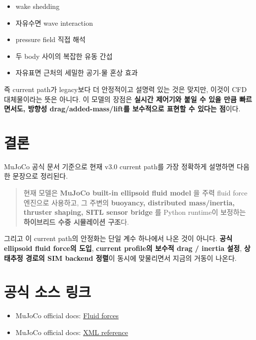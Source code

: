 \documentclass[11pt,a4paper]{article}
\begin{document}
\begin{itemize}[leftmargin=2em]
  \item wake shedding
  \item 자유수면 wave interaction
  \item pressure field 직접 해석
  \item 두 body 사이의 복잡한 유동 간섭
  \item 자유표면 근처의 세밀한 공기-물 혼상 효과
\end{itemize}

즉 current path가 legacy보다 더 안정적이고 설명력 있는 것은 맞지만, 이것이 CFD 대체물이라는 뜻은 아니다. 이 모델의 장점은 \textbf{실시간 제어기와 붙일 수 있을 만큼 빠르면서도, 방향성 drag/added-mass/lift를 보수적으로 표현할 수 있다는 점}이다.

\section{결론}

MuJoCo 공식 문서 기준으로 현재 v3.0 current path를 가장 정확하게 설명하면 다음 한 문장으로 정리된다.

\begin{quote}
현재 모델은 \textbf{MuJoCo built-in ellipsoid fluid model} 을 주력 fluid force 엔진으로 사용하고, 그 주변의 \textbf{buoyancy, distributed mass/inertia, thruster shaping, SITL sensor bridge} 를 Python runtime이 보정하는 \textbf{하이브리드 수중 시뮬레이션 구조}다.
\end{quote}

그리고 이 current path의 안정화는 단일 계수 하나에서 나온 것이 아니다. \textbf{공식 ellipsoid fluid force의 도입}, \textbf{current profile의 보수적 drag / inertia 설정}, \textbf{상태추정 경로의 SIM backend 정렬}이 동시에 맞물리면서 지금의 거동이 나온다.

\section*{공식 소스 링크}

\begin{itemize}[leftmargin=2em]
  \item MuJoCo official docs: \href{https://mujoco.readthedocs.io/en/3.1.1/computation/fluid.html}{Fluid forces}
  \item MuJoCo official docs: \href{https://mujoco.readthedocs.io/en/3.1.1/XMLreference.html}{XML reference}
\end{itemize}
\end{document}
